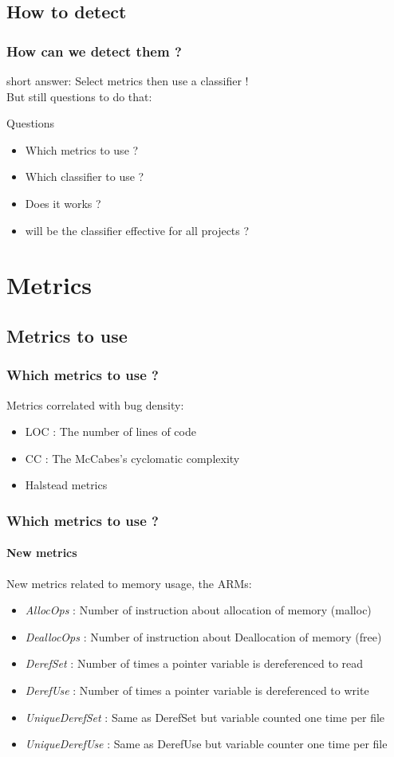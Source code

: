 \documentclass{beamer}
\begin{document}
\subsection{How to detect}
\begin{frame}
 \frametitle{How can we detect them ?}
 short answer: \alert{Select metrics then use a classifier !}\\
 But still questions to do that:\\
 \begin{block}{Questions}
  \begin{itemize}
   \item Which metrics to use ?
   \item Which classifier to use ?
   \item Does it works ?
   \item will be the classifier effective for all projects ?
  \end{itemize}
 \end{block}
\end{frame}

\section{Metrics}
\subsection{Metrics to use}
\begin{frame}
 \frametitle{Which metrics to use ?}
 Metrics correlated with bug density:
 \begin{itemize}
  \item LOC : The number of lines of code
  \item CC  : The McCabes's cyclomatic complexity
  \item Halstead metrics %
 \end{itemize}
\end{frame}

\begin{frame}
 \frametitle{Which metrics to use ?}
 \framesubtitle{New metrics} %
 New metrics related to memory usage, the \alert{ARMs}:
 \begin{itemize}
  \item \emph{AllocOps} : Number of instruction about allocation of memory (malloc)
  \item \emph{DeallocOps} : Number of instruction about Deallocation of memory (free)
  \item \emph{DerefSet} : Number of times a pointer variable is dereferenced to read%
  \item \emph{DerefUse} : Number of times a pointer variable is dereferenced to write
  \item \emph{UniqueDerefSet} : Same as DerefSet but variable counted one time per file
  \item \emph{UniqueDerefUse} : Same as DerefUse but variable counter one time per file
 \end{itemize}
\end{frame}
\end{document}
